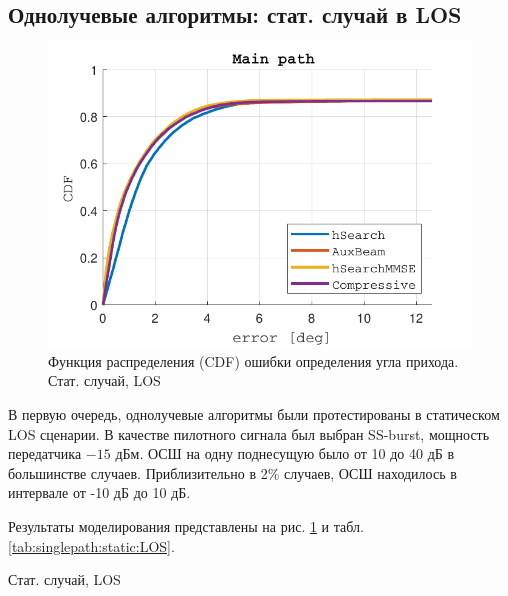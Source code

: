 \subsection{Однолучевые алгоритмы: стат. случай в LOS}


\begin{figure}[ht]
  \centering
  \includegraphics{results/rus/singlepath-static-LOS-1}
  \caption{Функция распределения (CDF) ошибки определения угла прихода. Стат. случай, LOS}
  \label{fig:singlepath:static:LOS}
\end{figure}

В первую очередь, однолучевые алгоритмы были протестированы в статическом LOS сценарии.
В качестве пилотного сигнала был выбран SS-burst, мощность передатчика $-15$ дБм.
ОСШ на одну поднесущую было от 10 до 40 дБ в большинстве случаев.
Приблизительно в 2\% случаев, ОСШ находилось в интервале от -10 дБ до 10 дБ.

Результаты моделирования представлены на рис. \ref{fig:singlepath:static:LOS} и
табл. \ref{tab:singlepath:static:LOS}. 
\begin{table}[h!]
  \begin{center}
    \caption{Стат. случай, LOS}
    \small
    \label{tab:singlepath:static:LOS}
  \end{center}
\end{table}

